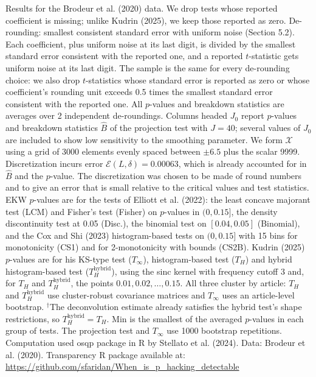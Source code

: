 \begin{table}[htbp]
\medskip
\begin{minipage}{\linewidth}
Results for the Brodeur et al. (2020) data. We drop tests whose reported coefficient is missing; unlike Kudrin (2025), we keep those reported as zero.
De-rounding: smallest consistent standard error with uniform noise (Section 5.2). Each coefficient, plus uniform noise at its last digit, is divided by the smallest standard error consistent with the reported one, and a reported $t$-statistic gets uniform noise at its last digit.
The sample is the same for every de-rounding choice: we also drop $t$-statistics whose standard error is reported as zero or whose coefficient's rounding unit exceeds 0.5 times the smallest standard error consistent with the reported one.
All $p$-values and breakdown statistics are averages over 2 independent de-roundings.
Columns headed $J_0$ report $p$-values and breakdown statistics $\widehat{B}$ of the projection test with $J=40$; several values of $J_0$ are included to show low sensitivity to the smoothing parameter.
We form $\mathcal{X}$ using a grid of 3000 elements evenly spaced between $\pm 6.5$ plus the scalar 9999.
Discretization incurs error $\mathcal{E}(L,\delta)=0.00063$, which is already accounted for in $\widehat{B}$ and the $p$-value.
The discretization was chosen to be made of round numbers and to give an error that is small relative to the critical values and test statistics.
EKW $p$-values are for the tests of Elliott et al. (2022): the least concave majorant test (LCM) and Fisher's test (Fisher) on $p$-values in $(0,0.15]$, the density discontinuity test at 0.05 (Disc.), the binomial test on $[0.04,0.05]$ (Binomial), and the Cox and Shi (2023) histogram-based tests on $(0,0.15]$ with 15 bins for monotonicity (CS1) and for 2-monotonicity with bounds (CS2B).
Kudrin (2025) $p$-values are for his KS-type test ($T_\infty$), histogram-based test ($T_H$) and hybrid histogram-based test ($T_H^{\mathrm{hybrid}}$), using the sinc kernel with frequency cutoff 3 and, for $T_H$ and $T_H^{\mathrm{hybrid}}$, the points $0.01,0.02,\ldots,0.15$.
All three cluster by article: $T_H$ and $T_H^{\mathrm{hybrid}}$ use cluster-robust covariance matrices and $T_\infty$ uses an article-level bootstrap.
$^\dagger$The deconvolution estimate already satisfies the hybrid test's shape restrictions, so $T_H^{\mathrm{hybrid}}=T_H$.
Min is the smallest of the averaged $p$-values in each group of tests.
The projection test and $T_\infty$ use 1000 bootstrap repetitions.
Computation used osqp package in R by Stellato et al. (2024). Data: Brodeur et al. (2020).
Transparency R package available at: \url{https://github.com/sfaridan/When_is_p_hacking_detectable}
\end{minipage}
\end{table}
